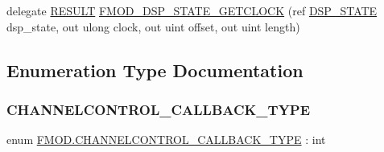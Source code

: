 \begin{DoxyCompactItemize}
\item 
delegate \hyperlink{namespace_f_m_o_d_a305d1176ef3f8c8815861a60407ac33d}{R\+E\+S\+U\+LT} \hyperlink{namespace_f_m_o_d_adb43437ae95767ee797729cca4edf4e8}{F\+M\+O\+D\+\_\+\+D\+S\+P\+\_\+\+S\+T\+A\+T\+E\+\_\+\+G\+E\+T\+C\+L\+O\+CK} (ref \hyperlink{struct_f_m_o_d_1_1_d_s_p___s_t_a_t_e}{D\+S\+P\+\_\+\+S\+T\+A\+TE} dsp\+\_\+state, out ulong clock, out uint offset, out uint length)
\end{DoxyCompactItemize}


\subsection{Enumeration Type Documentation}
\mbox{\label{namespace_f_m_o_d_a5d2474611c3f58385c86117a278bf1d7}} 
\subsubsection{\texorpdfstring{C\+H\+A\+N\+N\+E\+L\+C\+O\+N\+T\+R\+O\+L\+\_\+\+C\+A\+L\+L\+B\+A\+C\+K\+\_\+\+T\+Y\+PE}{CHANNELCONTROL\_CALLBACK\_TYPE}}
{\footnotesize\ttfamily enum \hyperlink{namespace_f_m_o_d_a5d2474611c3f58385c86117a278bf1d7}{F\+M\+O\+D.\+C\+H\+A\+N\+N\+E\+L\+C\+O\+N\+T\+R\+O\+L\+\_\+\+C\+A\+L\+L\+B\+A\+C\+K\+\_\+\+T\+Y\+PE} \+: int\hspace{0.3cm}{\ttfamily [strong]}}

